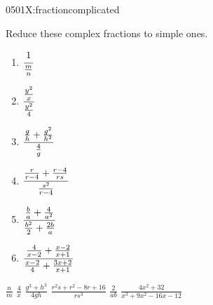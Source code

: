\begin{defproblem}{0501X:fractioncomplicated}%
\begin{onlyproblem}%
\begin{exercise}
Reduce these complex fractions to simple ones.
\begin{enumerate}
\item $\cfrac{1}{\frac{m}{n}}$
\item $\cfrac{\frac{y^2}{x}}{\frac{y^2}{4}}$
\item $\cfrac{\frac{g}{h}+\frac{g^2}{h^2}}{\frac{4}{g}}$
\item $\cfrac{\frac{r}{r-4}+\frac{r-4}{rs}}{\frac{s^2}{r-4}}$
\item $\cfrac{\frac{b}{a}+\frac{4}{a^2}}{\frac{b^2}{2}+\frac{2b}{a}}$
\item $\cfrac{\frac{4}{x-2}+\frac{x-2}{x+1}}{\frac{x-2}{4}+\frac{3x+2}{x+1}}$
\end{enumerate}
\end{exercise}
\end{onlyproblem}%
\begin{onlysolution}%
$\frac{n}{m}$
$\frac{4}{x}$
$\frac{g^3+h^3}{4gh}$
$\frac{r^2s+r^2-8r+16}{rs^3}$
$\frac{2}{ab}$
$\frac{4x^2+32}{x^3+9x^2-16x-12}$
\end{onlysolution}%
\end{defproblem}

\endinput
